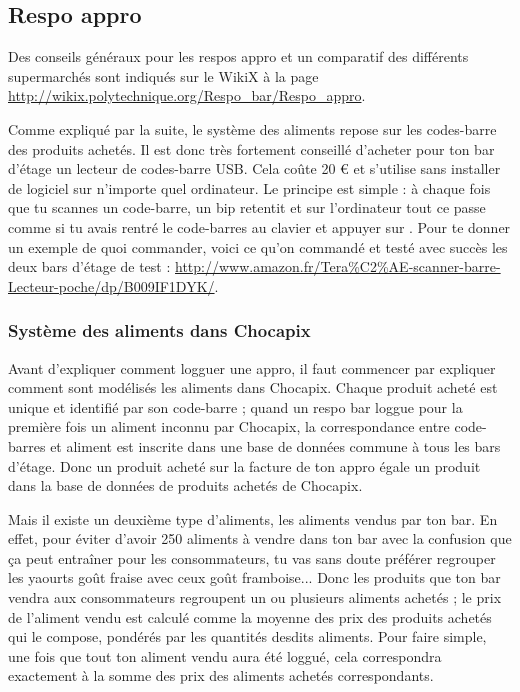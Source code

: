 \documentclass[12pt,french]{article}
\begin{document}
\subsection{Respo appro}

Des conseils généraux pour les respos appro et un comparatif des différents supermarchés sont indiqués sur le WikiX à la page \url{http://wikix.polytechnique.org/Respo_bar/Respo_appro}.

Comme expliqué par la suite, le système des aliments repose sur les codes-barre des produits achetés. Il est donc très fortement conseillé d'acheter pour ton bar d'étage un lecteur de codes-barre USB. Cela coûte 20 € et s'utilise sans installer de logiciel sur n'importe quel ordinateur. Le principe est simple : à chaque fois que tu scannes un code-barre, un bip retentit et sur l'ordinateur tout ce passe comme si tu avais rentré le code-barres au clavier et appuyer sur . Pour te donner un exemple de quoi commander, voici ce qu'on commandé et testé avec succès les deux bars d'étage de test : \url{http://www.amazon.fr/Tera%C2%AE-scanner-barre-Lecteur-poche/dp/B009IF1DYK/}.

\subsubsection{Système des aliments dans Chocapix}

Avant d'expliquer comment logguer une appro, il faut commencer par expliquer comment sont modélisés les aliments dans Chocapix. Chaque produit acheté est unique et identifié par son code-barre ; quand un respo bar loggue pour la première fois un aliment inconnu par Chocapix, la correspondance entre code-barres et aliment est inscrite dans une base de données commune à tous les bars d'étage. Donc un produit acheté sur la facture de ton appro égale un produit dans la base de données de produits achetés de Chocapix.

Mais il existe un deuxième type d'aliments, les aliments vendus par ton bar. En effet, pour éviter d'avoir 250 aliments à vendre dans ton bar avec la confusion que ça peut entraîner pour les consommateurs, tu vas sans doute préférer regrouper les yaourts goût fraise avec ceux goût framboise... Donc les produits que ton bar vendra aux consommateurs regroupent un ou plusieurs aliments achetés ; le prix de l'aliment vendu est calculé comme la moyenne des prix des produits achetés qui le compose, pondérés par les quantités desdits aliments. Pour faire simple, une fois que tout ton aliment vendu aura été loggué, cela correspondra exactement à la somme des prix des aliments achetés correspondants.
\end{document}

